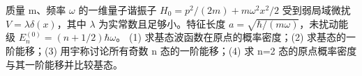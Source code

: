质量 m、频率 \(\omega \) 的一维量子谐振子 \(H_0=p^2/(2m)+m\omega^2x^2/2\) 受到弱局域微扰 \(V=\lambda\delta(x)\)，其中 \(\lambda \) 为实常数且足够小。特征长度 \(a=\sqrt{\hbar/(m\omega)}\)，未扰动能级 \(E_n^{(0)}=(n+1/2)\hbar\omega\)。
(1) 求基态波函数在原点的概率密度；(2) 求基态的一阶能移；(3) 用宇称讨论所有奇数 n 态的一阶能移；(4) 求 n=2 态的原点概率密度与其一阶能移并比较基态。
